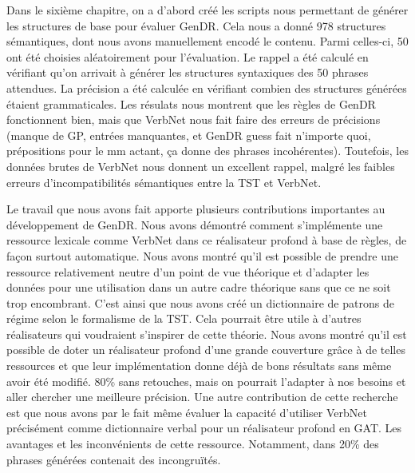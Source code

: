 Dans le sixième chapitre, on a d'abord créé les scripts nous permettant de générer les structures de base pour évaluer GenDR. Cela nous a donné 978 structures sémantiques, dont nous avons manuellement encodé le contenu. Parmi celles-ci, 50 ont été choisies aléatoirement pour l'évaluation. Le rappel a été calculé en vérifiant qu'on arrivait à générer les structures syntaxiques des 50 phrases attendues. La précision a été calculée en vérifiant combien des structures générées étaient grammaticales. Les résulats nous montrent que les règles de GenDR fonctionnent bien, mais que VerbNet nous fait faire des erreurs de précisions (manque de \ac{GP}, entrées manquantes, et GenDR guess fait n'importe quoi, prépositions pour le mm actant, ça donne des phrases incohérentes). Toutefois, les données brutes de VerbNet nous donnent un excellent rappel, malgré les faibles erreurs d'incompatibilités sémantiques entre la \ac{TST} et VerbNet.  

Le travail que nous avons fait apporte plusieurs contributions importantes au développement de GenDR. Nous avons démontré comment s'implémente une ressource lexicale comme VerbNet dans ce réalisateur profond à base de règles, de façon surtout automatique. Nous avons montré qu'il est possible de prendre une ressource relativement neutre d'un point de vue théorique et d'adapter les données pour une utilisation dans un autre cadre théorique sans que ce ne soit trop encombrant. C'est ainsi que nous avons créé un dictionnaire de patrons de régime selon le formalisme de la \ac{TST}. Cela pourrait être utile à d'autres réalisateurs qui voudraient s'inspirer de cette théorie. Nous avons montré qu'il est possible de doter un réalisateur profond d'une grande couverture grâce à de telles ressources et que leur implémentation donne déjà de bons résultats sans même avoir été modifié. 80\% sans retouches, mais on pourrait l'adapter à nos besoins et aller chercher une meilleure précision. Une autre contribution de cette recherche est que nous avons par le fait même évaluer la capacité d'utiliser VerbNet précisément comme dictionnaire verbal pour un réalisateur profond en GAT. Les avantages et les inconvénients de cette ressource. Notamment, dans 20\% des phrases générées contenait des incongruïtés.


